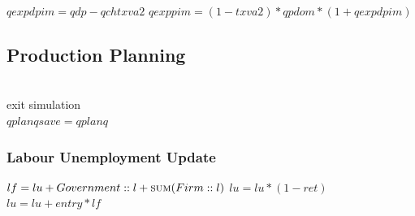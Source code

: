\documentclass{article}
\begin{document}
\begin{algorithm}[!htbp]
\caption{Quarterly Exp (External)}
    \begin{algorithmic}
        \State \(qexpdpim = qdp - qchtxva2\)
        \State \(qexppim=(1 - txva2) * qpdom * (1 + qexpdpim)\)
        \EndFunction
    \end{algorithmic}
\end{algorithm}

\subsection{Production Planning}

\begin{algorithm}[H]
\caption{Prodplan}
    \begin{algorithmic}
        \State {}
        \State {}
        \State {}
        \State {}
        \EndIf
        \EndFor
        \\
        \State exit simulation
        \EndIf
        \\
        \State \(qplanqsave = qplanq\)
        \EndFor
        \EndFunction
    \end{algorithmic}
\end{algorithm}

\subsubsection{Labour Unemployment Update}

\begin{algorithm}[H]
\caption{luupdate}
    \begin{algorithmic}
        \State {}
        \State {}
        \EndFor
        \EndFunction
    \end{algorithmic}
\end{algorithm}

\begin{algorithm}[!htbp]
\caption{luupdate (Labour)}
    \begin{algorithmic}
        \State \(lf = lu + Government::l + \Call{sum}{Firm::l}\)
        \State \(lu = lu * (1-ret)\)
        \State \(lu = lu + entry*lf\)
        \EndFunction
    \end{algorithmic}
\end{algorithm}
\end{document}
